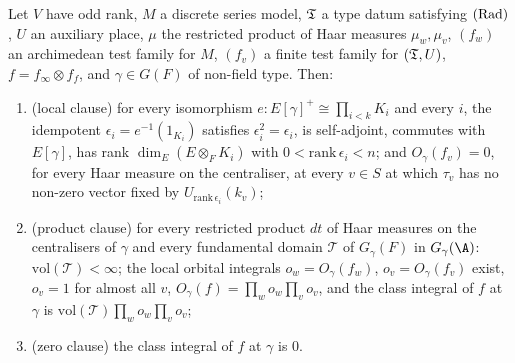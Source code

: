 \begin{lemma}\label{pf:multnc:nonfield}
Let $V$ have odd rank, $M$ a discrete series model, $\mathfrak{T}$ a type datum satisfying $\textup{(Rad)}$, $U$ an auxiliary
place, $\mu$ the restricted product of Haar measures $\mu_w,\mu_v$, $(f_w)$ an archimedean test family for $M$, $(f_v)$ a
finite test family for $(\mathfrak{T},U)$, $f=f_\infty\otimes f_f$, and $\gamma\in G(F)$ of non-field type. Then:
\begin{enumerate}[label=(\alph*)]
\item (local clause) for every isomorphism $e\colon E[\gamma]^+\cong\prod_{i<k}K_i$ and every $i$, the idempotent
$\epsilon_i=e^{-1}(1_{K_i})$ satisfies $\epsilon_i^2=\epsilon_i$, is self-adjoint, commutes with $E[\gamma]$, has rank
$\dim_E(E\otimes_FK_i)$ with $0<\mathrm{rank}\,\epsilon_i<n$; and $O_\gamma(f_v)=0$, for every Haar measure on the
centraliser, at every $v\in S$ at which $\tau_v$ has no non-zero vector fixed by $U_{\mathrm{rank}\,\epsilon_i}(k_v)$;
\item (product clause) for every restricted product $dt$ of Haar measures on the centralisers of $\gamma$ and every
fundamental domain $\mathcal T$ of $G_\gamma(F)$ in $G_\gamma(\A)$: $\mathrm{vol}(\mathcal T)<\infty$; the local orbital
integrals $o_w=O_\gamma(f_w)$, $o_v=O_\gamma(f_v)$ exist, $o_v=1$ for almost all $v$, $O_\gamma(f)=\prod_wo_w\prod_vo_v$,
and the class integral of $f$ at $\gamma$ is $\mathrm{vol}(\mathcal T)\prod_wo_w\prod_vo_v$;
\item (zero clause) the class integral of $f$ at $\gamma$ is $0$.
\end{enumerate}
\end{lemma}

